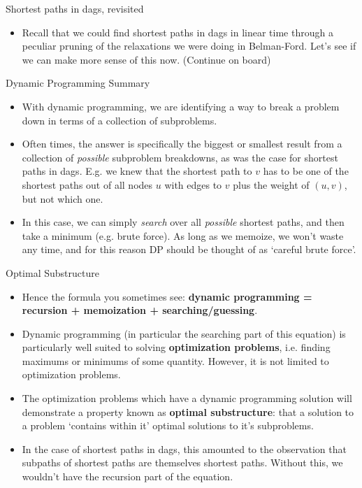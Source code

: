 \documentclass{beamer}
\begin{document}
\begin{frame}{Shortest paths in dags, revisited}
    \begin{itemize}
        \item Recall that we could find shortest paths in dags in linear time through a peculiar pruning of the relaxations we were doing in Belman-Ford. Let's see if we can make more sense of this now. (Continue on board)
    \end{itemize}
\end{frame}

\begin{frame}{Dynamic Programming Summary}
    \begin{itemize}
        \item With dynamic programming, we are identifying a way to break a problem down in terms of a collection of subproblems. 
        \item Often times, the answer is specifically the biggest or smallest result from a collection of \emph{possible} subproblem breakdowns, as was the case for shortest paths in dags. E.g. we knew that the shortest path to $v$ has to be one of the shortest paths out of all nodes $u$ with edges to $v$ plus the weight of $(u,v)$, but not which one. 
        \item In this case, we can simply \emph{search} over all \emph{possible} shortest paths, and then take a minimum (e.g. brute force). As long as we memoize, we won't waste any time, and for this reason DP should be thought of as `careful brute force'.  
    \end{itemize}
\end{frame}

\begin{frame}{Optimal Substructure}
    \begin{itemize}
        \item Hence the formula you sometimes see: \textbf{dynamic programming = recursion + memoization + searching/guessing}. 
        \item Dynamic programming (in particular the searching part of this equation) is particularly well suited to solving \textbf{optimization problems}, i.e. finding maximums or minimums of some quantity. However, it is not limited to optimization problems. 
        \item The optimization problems which have a dynamic programming solution will demonstrate a property known as \textbf{optimal substructure}: that a solution to a problem `contains within it' optimal solutions to it's subproblems. \pause 
        \item In the case of shortest paths in dags, this amounted to the observation that subpaths of shortest paths are themselves shortest paths. Without this, we wouldn't have the recursion part of the equation. \pause 
    \end{itemize}
\end{frame}
\end{document}
